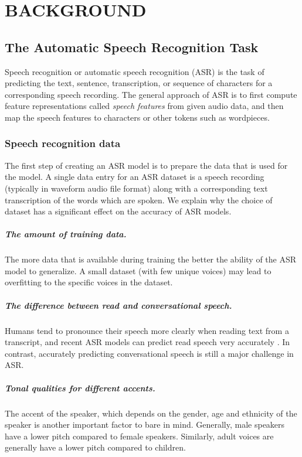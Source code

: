 \chapter{BACKGROUND}



\section{The Automatic Speech Recognition Task}\label{sec:background}
Speech recognition or automatic speech recognition (ASR) is the task of 
predicting the text, sentence, transcription, or sequence of characters 
for a corresponding speech recording.
The general approach of ASR is to first compute feature representations called \emph{speech features} from given audio data,
and then map the speech features to characters or other tokens such as wordpieces.



\subsection{Speech recognition data}
The first step of creating an ASR model is to prepare the data that is used for the model.
A single data entry for an ASR dataset is a speech recording (typically in waveform audio file format)
along with a corresponding text transcription of the words which are spoken.
We explain why the choice of dataset has a significant effect on the accuracy of ASR models.

\paragraph*{The amount of training data.} The more data that is available during training the better the ability
of the ASR model to generalize. A small dataset (with few unique voices) may lead to overfitting to the specific 
voices in the dataset.
\paragraph*{The difference between read and conversational speech.} Humans tend to pronounce their speech more clearly 
when reading text from a transcript, and recent ASR models can predict read speech very accurately \cite{jurafskyspeech}.
In contrast, accurately predicting conversational speech is still a major challenge in ASR.
\paragraph*{Tonal qualities for different accents.} The accent of the speaker, which depends on the gender, 
age and ethnicity of the speaker is another important factor to bare in mind. Generally, male speakers
have a lower pitch compared to female speakers. Similarly, adult voices are generally have a lower pitch
compared to children.
